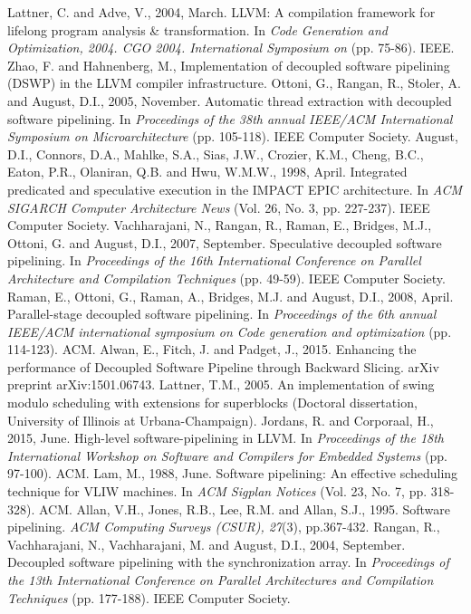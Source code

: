 \documentclass[letterpaper, 10 pt, conference]{ieeeconf}  %
\begin{document}
\begin{thebibliography}{3}

 Lattner, C. and Adve, V., 2004, March. LLVM: A compilation framework for lifelong program analysis \& transformation. In \textit{Code Generation and Optimization, 2004. CGO 2004. International Symposium on} (pp. 75-86). IEEE.
 Zhao, F. and Hahnenberg, M., Implementation of decoupled software pipelining (DSWP) in the LLVM compiler infrastructure.
 Ottoni, G., Rangan, R., Stoler, A. and August, D.I., 2005, November. Automatic thread extraction with decoupled software pipelining. In \textit{Proceedings of the 38th annual IEEE/ACM International Symposium on Microarchitecture} (pp. 105-118). IEEE Computer Society.
 August, D.I., Connors, D.A., Mahlke, S.A., Sias, J.W., Crozier, K.M., Cheng, B.C., Eaton, P.R., Olaniran, Q.B. and Hwu, W.M.W., 1998, April. Integrated predicated and speculative execution in the IMPACT EPIC architecture. In \textit{ACM SIGARCH Computer Architecture News} (Vol. 26, No. 3, pp. 227-237). IEEE Computer Society.
 Vachharajani, N., Rangan, R., Raman, E., Bridges, M.J., Ottoni, G. and August, D.I., 2007, September. Speculative decoupled software pipelining. In \textit{Proceedings of the 16th International Conference on Parallel Architecture and Compilation Techniques} (pp. 49-59). IEEE Computer Society.
 Raman, E., Ottoni, G., Raman, A., Bridges, M.J. and August, D.I., 2008, April. Parallel-stage decoupled software pipelining. In \textit{Proceedings of the 6th annual IEEE/ACM international symposium on Code generation and optimization} (pp. 114-123). ACM.
 Alwan, E., Fitch, J. and Padget, J., 2015. Enhancing the performance of Decoupled Software Pipeline through Backward Slicing. arXiv preprint arXiv:1501.06743.
 Lattner, T.M., 2005. An implementation of swing modulo scheduling with extensions for superblocks (Doctoral dissertation, University of Illinois at Urbana-Champaign).
 Jordans, R. and Corporaal, H., 2015, June. High-level software-pipelining in LLVM. In \textit{Proceedings of the 18th International Workshop on Software and Compilers for Embedded Systems} (pp. 97-100). ACM.
 Lam, M., 1988, June. Software pipelining: An effective scheduling technique for VLIW machines. In \textit{ACM Sigplan Notices} (Vol. 23, No. 7, pp. 318-328). ACM.
 Allan, V.H., Jones, R.B., Lee, R.M. and Allan, S.J., 1995. Software pipelining. \textit{ACM Computing Surveys (CSUR), 27}(3), pp.367-432.
 Rangan, R., Vachharajani, N., Vachharajani, M. and August, D.I., 2004, September. Decoupled software pipelining with the synchronization array. In \textit{Proceedings of the 13th International Conference on Parallel Architectures and Compilation Techniques} (pp. 177-188). IEEE Computer Society.

\end{thebibliography}
\end{document}

